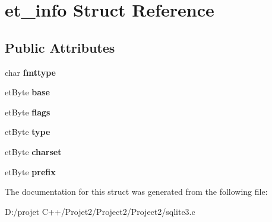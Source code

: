 \hypertarget{structet__info}{}\section{et\+\_\+info Struct Reference}
\label{structet__info}
\subsection*{Public Attributes}
\begin{DoxyCompactItemize}
\item 
\mbox{\label{structet__info_a1740af27f0c9d5840e7dda59a129aa4b}} 
char {\bfseries fmttype}
\item 
\mbox{\label{structet__info_a20f5a4c11c7aa1d9c777805d11965c66}} 
et\+Byte {\bfseries base}
\item 
\mbox{\label{structet__info_a8f11646aaec803f0870683dc3ba2f756}} 
et\+Byte {\bfseries flags}
\item 
\mbox{\label{structet__info_a148bd1efa49018c9a723701ba5747825}} 
et\+Byte {\bfseries type}
\item 
\mbox{\label{structet__info_a77131acb7479b0e6aad61af0901e11c2}} 
et\+Byte {\bfseries charset}
\item 
\mbox{\label{structet__info_a23cc866bf202c34e49bd49599b051628}} 
et\+Byte {\bfseries prefix}
\end{DoxyCompactItemize}


The documentation for this struct was generated from the following file\+:\begin{DoxyCompactItemize}
\item 
D\+:/projet C++/\+Projet2/\+Project2/\+Project2/sqlite3.\+c\end{DoxyCompactItemize}
